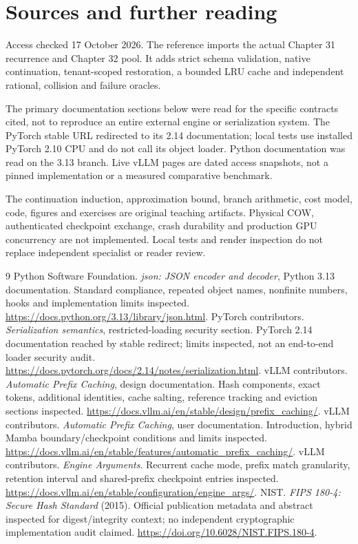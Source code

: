\chapter*{Sources and further reading}

Access checked 17 October 2026. The reference imports the actual Chapter 31 recurrence and Chapter 32 pool. It adds strict schema validation, native continuation, tenant-scoped restoration, a bounded LRU cache and independent rational, collision and failure oracles.

The primary documentation sections below were read for the specific contracts
cited, not to reproduce an entire external engine or serialization system.
The PyTorch stable URL redirected to its 2.14 documentation; local tests use
installed PyTorch 2.10 CPU and do not call its object loader. Python documentation
was read on the 3.13 branch. Live vLLM pages are dated access snapshots, not a
pinned implementation or a measured comparative benchmark.

The continuation induction, approximation bound, branch arithmetic, cost model,
code, figures and exercises are original teaching artifacts. Physical COW,
authenticated checkpoint exchange, crash durability and production GPU
concurrency are not implemented. Local tests and render inspection do not
replace independent specialist or reader review.

\begin{thebibliography}{9}
 Python Software Foundation.
\emph{json: JSON encoder and decoder}, Python 3.13 documentation.
Standard compliance, repeated object names, nonfinite numbers, hooks and
implementation limits inspected.
\url{https://docs.python.org/3.13/library/json.html}.
 PyTorch contributors.
\emph{Serialization semantics}, restricted-loading security section.
PyTorch 2.14 documentation reached by stable redirect; limits inspected,
not an end-to-end loader security audit.
\url{https://docs.pytorch.org/docs/2.14/notes/serialization.html}.
 vLLM contributors.
\emph{Automatic Prefix Caching}, design documentation.
Hash components, exact tokens, additional identities, cache salting,
reference tracking and eviction sections inspected.
\url{https://docs.vllm.ai/en/stable/design/prefix_caching/}.
 vLLM contributors.
\emph{Automatic Prefix Caching}, user documentation.
Introduction, hybrid Mamba boundary/checkpoint conditions and limits inspected.
\url{https://docs.vllm.ai/en/stable/features/automatic_prefix_caching/}.
 vLLM contributors.
\emph{Engine Arguments}. Recurrent cache mode, prefix match granularity,
retention interval and shared-prefix checkpoint entries inspected.
\url{https://docs.vllm.ai/en/stable/configuration/engine_args/}.
 NIST. \emph{FIPS 180-4: Secure Hash Standard} (2015).
Official publication metadata and abstract inspected for digest/integrity
context; no independent cryptographic implementation audit claimed.
\url{https://doi.org/10.6028/NIST.FIPS.180-4}.
\end{thebibliography}
